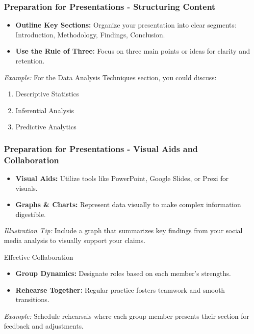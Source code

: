 \documentclass{beamer}
\begin{document}
\begin{frame}[fragile]
    \frametitle{Preparation for Presentations - Structuring Content}
    \begin{itemize}
        \item \textbf{Outline Key Sections:} Organize your presentation into clear segments: Introduction, Methodology, Findings, Conclusion.
        \item \textbf{Use the Rule of Three:} Focus on three main points or ideas for clarity and retention.
    \end{itemize}
    \textit{Example:} For the Data Analysis Techniques section, you could discuss:
    \begin{enumerate}
        \item Descriptive Statistics
        \item Inferential Analysis
        \item Predictive Analytics
    \end{enumerate}
\end{frame}

\begin{frame}[fragile]
    \frametitle{Preparation for Presentations - Visual Aids and Collaboration}
    \begin{itemize}
        \item \textbf{Visual Aids:} Utilize tools like PowerPoint, Google Slides, or Prezi for visuals.
        \item \textbf{Graphs \& Charts:} Represent data visually to make complex information digestible.
    \end{itemize}
    \textit{Illustration Tip:} Include a graph that summarizes key findings from your social media analysis to visually support your claims.

    \begin{block}{Effective Collaboration}
        \begin{itemize}
            \item \textbf{Group Dynamics:} Designate roles based on each member's strengths.
            \item \textbf{Rehearse Together:} Regular practice fosters teamwork and smooth transitions.
        \end{itemize}
        \textit{Example:} Schedule rehearsals where each group member presents their section for feedback and adjustments.
    \end{block}
\end{frame}
\end{document}
